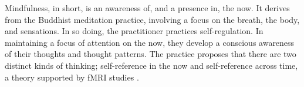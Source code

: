 Mindfulness, in short, is an awareness of, and a presence in, the now. It derives from the Buddhist meditation practice, involving a focus on the breath, the body, and sensations. In so doing, the practitioner practices self-regulation. In maintaining a focus of attention on the now, they develop a conscious awareness of their thoughts and thought patterns. The practice proposes that there are two distinct kinds of thinking; self-reference in the now and self-reference across time, a theory supported by fMRI studies \citep{farb_attending_2007}.
  
  
